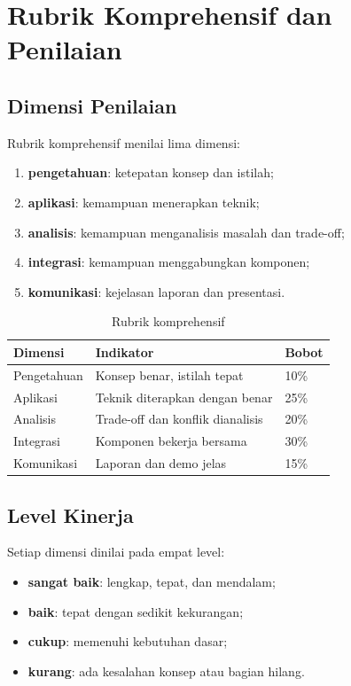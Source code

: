 \section{Rubrik Komprehensif dan Penilaian}
\label{sec:ch17-rubrik}

\subsection{Dimensi Penilaian}

Rubrik komprehensif menilai lima dimensi:
\begin{enumerate}[label=\arabic*.,leftmargin=*]
  \item \textbf{pengetahuan}: ketepatan konsep dan istilah;
  \item \textbf{aplikasi}: kemampuan menerapkan teknik;
  \item \textbf{analisis}: kemampuan menganalisis masalah dan
        trade-off;
  \item \textbf{integrasi}: kemampuan menggabungkan komponen;
  \item \textbf{komunikasi}: kejelasan laporan dan presentasi.
\end{enumerate}

\begin{table}[H]
\centering
\caption{Rubrik komprehensif}
\label{tab:ch17-rubrik}
\begin{tabularx}{\textwidth}{@{}l X l@{}}
\toprule
\textbf{Dimensi} & \textbf{Indikator} & \textbf{Bobot} \\
\midrule
Pengetahuan & Konsep benar, istilah tepat & 10\% \\
Aplikasi & Teknik diterapkan dengan benar & 25\% \\
Analisis & Trade-off dan konflik dianalisis & 20\% \\
Integrasi & Komponen bekerja bersama & 30\% \\
Komunikasi & Laporan dan demo jelas & 15\% \\
\bottomrule
\end{tabularx}
\end{table}

\subsection{Level Kinerja}

Setiap dimensi dinilai pada empat level:
\begin{itemize}[leftmargin=*]
  \item \textbf{sangat baik}: lengkap, tepat, dan mendalam;
  \item \textbf{baik}: tepat dengan sedikit kekurangan;
  \item \textbf{cukup}: memenuhi kebutuhan dasar;
  \item \textbf{kurang}: ada kesalahan konsep atau bagian hilang.
\end{itemize}

